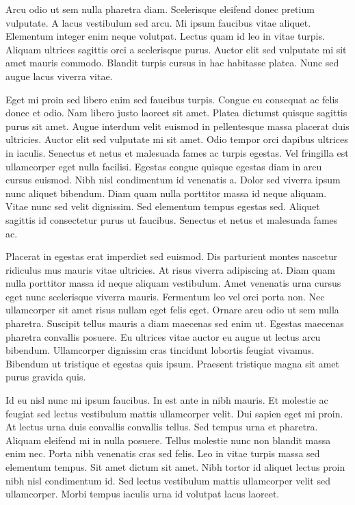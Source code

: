 \documentclass[11pt,a4paper]{article}
\begin{document}
Arcu odio ut sem nulla pharetra diam. Scelerisque eleifend donec pretium vulputate. A lacus vestibulum sed arcu. Mi ipsum faucibus vitae aliquet. Elementum integer enim neque volutpat. Lectus quam id leo in vitae turpis. Aliquam ultrices sagittis orci a scelerisque purus. Auctor elit sed vulputate mi sit amet mauris commodo. Blandit turpis cursus in hac habitasse platea. Nunc sed augue lacus viverra vitae.

Eget mi proin sed libero enim sed faucibus turpis. Congue eu consequat ac felis donec et odio. Nam libero justo laoreet sit amet. Platea dictumst quisque sagittis purus sit amet. Augue interdum velit euismod in pellentesque massa placerat duis ultricies. Auctor elit sed vulputate mi sit amet. Odio tempor orci dapibus ultrices in iaculis. Senectus et netus et malesuada fames ac turpis egestas. Vel fringilla est ullamcorper eget nulla facilisi. Egestas congue quisque egestas diam in arcu cursus euismod. Nibh nisl condimentum id venenatis a. Dolor sed viverra ipsum nunc aliquet bibendum. Diam quam nulla porttitor massa id neque aliquam. Vitae nunc sed velit dignissim. Sed elementum tempus egestas sed. Aliquet sagittis id consectetur purus ut faucibus. Senectus et netus et malesuada fames ac.

Placerat in egestas erat imperdiet sed euismod. Dis parturient montes nascetur ridiculus mus mauris vitae ultricies. At risus viverra adipiscing at. Diam quam nulla porttitor massa id neque aliquam vestibulum. Amet venenatis urna cursus eget nunc scelerisque viverra mauris. Fermentum leo vel orci porta non. Nec ullamcorper sit amet risus nullam eget felis eget. Ornare arcu odio ut sem nulla pharetra. Suscipit tellus mauris a diam maecenas sed enim ut. Egestas maecenas pharetra convallis posuere. Eu ultrices vitae auctor eu augue ut lectus arcu bibendum. Ullamcorper dignissim cras tincidunt lobortis feugiat vivamus. Bibendum ut tristique et egestas quis ipsum. Praesent tristique magna sit amet purus gravida quis.

Id eu nisl nunc mi ipsum faucibus. In est ante in nibh mauris. Et molestie ac feugiat sed lectus vestibulum mattis ullamcorper velit. Dui sapien eget mi proin. At lectus urna duis convallis convallis tellus. Sed tempus urna et pharetra. Aliquam eleifend mi in nulla posuere. Tellus molestie nunc non blandit massa enim nec. Porta nibh venenatis cras sed felis. Leo in vitae turpis massa sed elementum tempus. Sit amet dictum sit amet. Nibh tortor id aliquet lectus proin nibh nisl condimentum id. Sed lectus vestibulum mattis ullamcorper velit sed ullamcorper. Morbi tempus iaculis urna id volutpat lacus laoreet.
\end{document}
